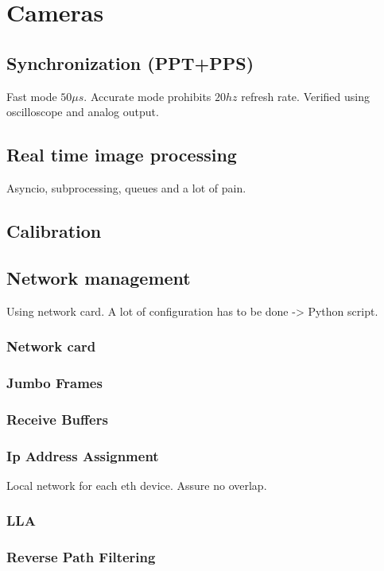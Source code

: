 \chapter{Cameras}

\section{Synchronization (PPT+PPS)}
Fast mode \approx $50\mu s$. Accurate mode prohibits $20hz$ refresh rate.
Verified using oscilloscope and analog output.

\section{Real time image processing}
Asyncio, subprocessing, queues and a lot of pain.



\section{Calibration}


\section{Network management}

Using network card.
A lot of configuration has to be done -> Python script.
\subsection*{Network card}
\subsection*{Jumbo Frames}
\subsection*{Receive Buffers}
\subsection*{Ip Address Assignment}
Local network for each eth device.
Assure no overlap.
\subsection*{LLA}
\subsection*{Reverse Path Filtering}



